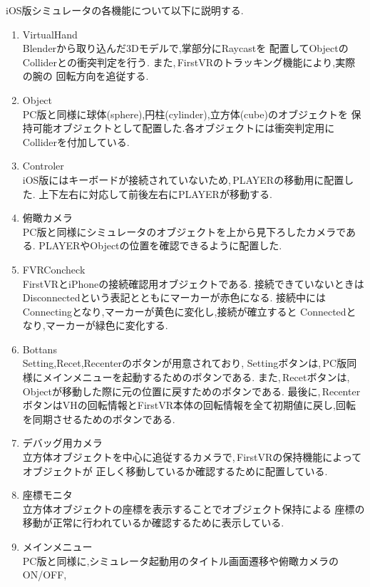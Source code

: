\documentclass{ltjsreport}
\begin{document}
		iOS版シミュレータの各機能について以下に説明する.
		\begin{enumerate}
			\renewcommand{\labelenumi}{\textcircled{\scriptsize \theenumi}}
			\item VirtualHand\\
				Blenderから取り込んだ3Dモデルで,掌部分にRaycastを
				配置してObjectのColliderとの衝突判定を行う.
				また,\,FirstVRのトラッキング機能により,実際の腕の
				回転方向を追従する.
			\item Object\\
				PC版と同様に球体(sphere),円柱(cylinder),立方体(cube)のオブジェクトを
				保持可能オブジェクトとして配置した.各オブジェクトには衝突判定用にColliderを付加している.
			\item Controler\\
				iOS版にはキーボードが接続されていないため,\,PLAYERの移動用に配置した.
				上下左右に対応して前後左右にPLAYERが移動する.
			\item 俯瞰カメラ\\
				PC版と同様にシミュレータのオブジェクトを上から見下ろしたカメラである.
				PLAYERやObjectの位置を確認できるように配置した.
			\item FVRConcheck\\
				FirstVRとiPhoneの接続確認用オブジェクトである.
				接続できていないときはDisconnectedという表記とともにマーカーが赤色になる.
				接続中にはConnectingとなり,マーカーが黄色に変化し,接続が確立すると
				Connectedとなり,マーカーが緑色に変化する.
			\item Bottans\\
				Setting,Recet,Recenterのボタンが用意されており,
				Settingボタンは,\,PC版同様にメインメニューを起動するためのボタンである.
				また,\,Recetボタンは,\,Objectが移動した際に元の位置に戻すためのボタンである.
				最後に,\,RecenterボタンはVHの回転情報とFirstVR本体の回転情報を全て初期値に戻し,回転を同期させるためのボタンである.
			\item デバッグ用カメラ\\
				立方体オブジェクトを中心に追従するカメラで,\,FirstVRの保持機能によってオブジェクトが
				正しく移動しているか確認するために配置している.
			\item 座標モニタ\\
				立方体オブジェクトの座標を表示することでオブジェクト保持による
				座標の移動が正常に行われているか確認するために表示している.
			\item メインメニュー\\
				PC版と同様に,シミュレータ起動用のタイトル画面遷移や俯瞰カメラのON/OFF,

\end{enumerate}
\end{document}
